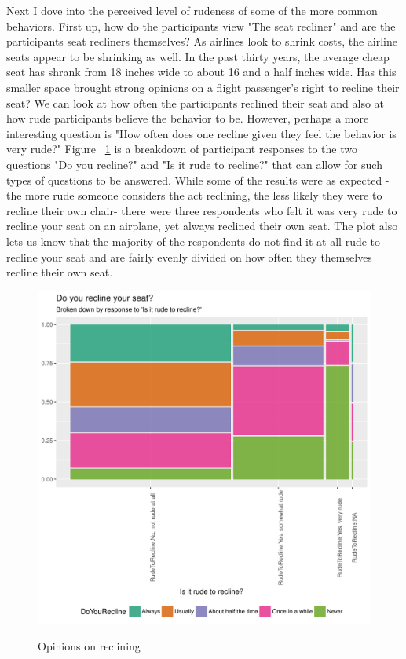 \documentclass[DIV=calc, paper=a4, fontsize=10pt, twocolumn]{scrartcl}	 %
\begin{document}
\par Next I dove into the perceived level of rudeness of some of the more common behaviors. First up, how do the participants view "The seat recliner" and are the participants seat recliners themselves? As airlines look to shrink costs, the  airline seats appear to be shrinking as well. In the past thirty years, the average cheap seat has shrank from 18 inches wide to about 16 and a half inches wide. \citet{washpost} Has this smaller space brought strong opinions on a flight passenger's right to recline their seat? We can look at how often the participants reclined their seat and also at how rude participants believe the behavior to be. However, perhaps a more interesting question is "How often does one recline given they feel the behavior is very rude?" Figure ~\ref{fig: recline} is a breakdown of participant responses to the two questions "Do you recline?" and "Is it rude to recline?" that can allow for such types of questions to be answered. While some of the results were as expected - the more rude someone considers the act reclining, the less likely they were to recline their own chair- there were three respondents who felt it was very rude to recline your seat on an airplane, yet always reclined their own seat. The plot also lets us know that the majority of the respondents do not find it at all rude to recline your seat and are fairly evenly divided on how often they themselves recline their own seat.


\begin{figure}[h!]
\caption{Opinions on reclining}
\centering
\includegraphics{flying-recline}
\label{fig: recline}
\end{figure}
\end{document}
